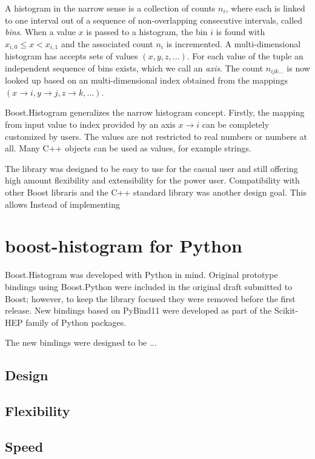\documentclass{webofc}
\begin{document}
A histogram in the narrow sense is a collection of counts $n_i$, where each is linked to one interval out of a sequence of non-overlapping consecutive intervals, called \emph{bins}. When a value $x$ is passed to a histogram, the bin $i$ is found with $x_{i,0} \le x < x_{i,1}$ and the associated count $n_i$ is incremented. A multi-dimensional histogram has accepts sets of values $(x, y, z, ...)$. For each value of the tuple an independent sequence of bins exists, which we call an \emph{axis}. The count $n_{ijk\dots}$ is now looked up based on an multi-dimensional index obtained from the mappings $(x \rightarrow i, y \rightarrow j, z \rightarrow k, ...)$.

Boost.Histogram generalizes the narrow histogram concept. Firstly, the mapping from input value to index provided by an axis $x \rightarrow i$ can be completely customized by users. The values are not restricted to real numbers or numbers at all. Many C++ objects can be used as values, for example strings.

The library was designed to be easy to use for the casual user and still offering high amount flexibility and extensibility for the power user. Compatibility with other Boost libraris and the C++ standard library was another design goal. This allows Instead of implementing



\section{boost-histogram for Python}
\label{sec-bh-py}


Boost.Histogram was developed with Python in mind. Original prototype bindings using Boost.Python were included in the original draft submitted to Boost; however, to keep the library focused they were removed before the first release. New bindings based on PyBind11 were developed as part of the Scikit-HEP family of Python packages.

The new bindings were designed to be ...

\subsection{Design}
\subsection{Flexibility}
\subsection{Speed}
\end{document}
